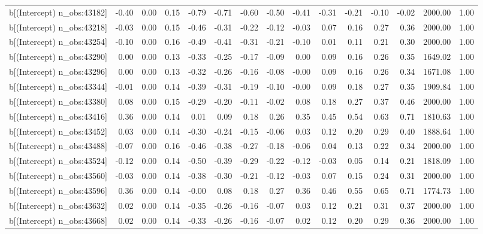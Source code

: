 \begin{table}[ht]
\begin{tabular}{rrrrrrrrrrrrrrr}
  b[(Intercept) n\_obs:43182] & -0.40 & 0.00 & 0.15 & -0.79 & -0.71 & -0.60 & -0.50 & -0.41 & -0.31 & -0.21 & -0.10 & -0.02 & 2000.00 & 1.00 \\ 
  b[(Intercept) n\_obs:43218] & -0.03 & 0.00 & 0.15 & -0.46 & -0.31 & -0.22 & -0.12 & -0.03 & 0.07 & 0.16 & 0.27 & 0.36 & 2000.00 & 1.00 \\ 
  b[(Intercept) n\_obs:43254] & -0.10 & 0.00 & 0.16 & -0.49 & -0.41 & -0.31 & -0.21 & -0.10 & 0.01 & 0.11 & 0.21 & 0.30 & 2000.00 & 1.00 \\ 
  b[(Intercept) n\_obs:43290] & 0.00 & 0.00 & 0.13 & -0.33 & -0.25 & -0.17 & -0.09 & 0.00 & 0.09 & 0.16 & 0.26 & 0.35 & 1649.02 & 1.00 \\ 
  b[(Intercept) n\_obs:43296] & 0.00 & 0.00 & 0.13 & -0.32 & -0.26 & -0.16 & -0.08 & -0.00 & 0.09 & 0.16 & 0.26 & 0.34 & 1671.08 & 1.00 \\ 
  b[(Intercept) n\_obs:43344] & -0.01 & 0.00 & 0.14 & -0.39 & -0.31 & -0.19 & -0.10 & -0.00 & 0.09 & 0.18 & 0.27 & 0.35 & 1909.84 & 1.00 \\ 
  b[(Intercept) n\_obs:43380] & 0.08 & 0.00 & 0.15 & -0.29 & -0.20 & -0.11 & -0.02 & 0.08 & 0.18 & 0.27 & 0.37 & 0.46 & 2000.00 & 1.00 \\ 
  b[(Intercept) n\_obs:43416] & 0.36 & 0.00 & 0.14 & 0.01 & 0.09 & 0.18 & 0.26 & 0.35 & 0.45 & 0.54 & 0.63 & 0.71 & 1810.63 & 1.00 \\ 
  b[(Intercept) n\_obs:43452] & 0.03 & 0.00 & 0.14 & -0.30 & -0.24 & -0.15 & -0.06 & 0.03 & 0.12 & 0.20 & 0.29 & 0.40 & 1888.64 & 1.00 \\ 
  b[(Intercept) n\_obs:43488] & -0.07 & 0.00 & 0.16 & -0.46 & -0.38 & -0.27 & -0.18 & -0.06 & 0.04 & 0.13 & 0.22 & 0.34 & 2000.00 & 1.00 \\ 
  b[(Intercept) n\_obs:43524] & -0.12 & 0.00 & 0.14 & -0.50 & -0.39 & -0.29 & -0.22 & -0.12 & -0.03 & 0.05 & 0.14 & 0.21 & 1818.09 & 1.00 \\ 
  b[(Intercept) n\_obs:43560] & -0.03 & 0.00 & 0.14 & -0.38 & -0.30 & -0.21 & -0.12 & -0.03 & 0.07 & 0.15 & 0.24 & 0.31 & 2000.00 & 1.00 \\ 
  b[(Intercept) n\_obs:43596] & 0.36 & 0.00 & 0.14 & -0.00 & 0.08 & 0.18 & 0.27 & 0.36 & 0.46 & 0.55 & 0.65 & 0.71 & 1774.73 & 1.00 \\ 
  b[(Intercept) n\_obs:43632] & 0.02 & 0.00 & 0.14 & -0.35 & -0.26 & -0.16 & -0.07 & 0.03 & 0.12 & 0.21 & 0.31 & 0.37 & 2000.00 & 1.00 \\ 
  b[(Intercept) n\_obs:43668] & 0.02 & 0.00 & 0.14 & -0.33 & -0.26 & -0.16 & -0.07 & 0.02 & 0.12 & 0.20 & 0.29 & 0.36 & 2000.00 & 1.00 \\ 

\end{tabular}
\end{table}

